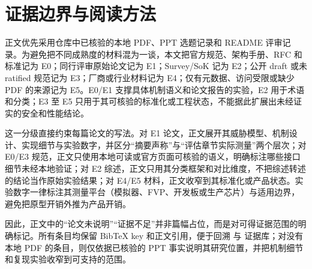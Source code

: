 \documentclass[11pt]{ctexart}
\begin{document}
\section{证据边界与阅读方法}

正文优先采用仓库中已核验的本地 PDF、PPT 选题记录和 README 评审记录。为避免把不同成熟度的材料混为一谈，本文把官方规范、架构手册、RFC 和标准记为 E0；同行评审原始论文记为 E1；Survey/SoK 记为 E2；公开 draft 或未 ratified 规范记为 E3；厂商或行业材料记为 E4；仅有元数据、访问受限或缺少 PDF 的来源记为 E5。E0/E1 支撑具体机制语义和论文报告的实验，E2 用于术语和分类；E3 至 E5 只用于其可核验的标准化或工程状态，不能据此扩展出未经证实的安全和性能结论。

这一分级直接约束每篇论文的写法。对 E1 论文，正文展开其威胁模型、机制设计、实现细节与实验数字，并区分“摘要声称”与“评估章节实际测量”两个层次；对 E0/E3 规范，正文只使用本地可读或官方页面可核验的语义，明确标注哪些接口细节未经本地验证；对 E2 综述，正文只用其分类框架和对比维度，不把综述转述的结论当作原始实验结果；对 E4/E5 材料，正文收窄到其标准化或产品状态。实验数字一律标注其测量平台（模拟器、FVP、开发板或生产芯片）与适用边界，避免把原型开销外推为产品开销。

因此，正文中的“论文未说明”“证据不足”并非篇幅占位，而是对可得证据范围的明确标记。所有条目均保留 BibTeX key 和正文引用，便于回溯  与  证据库；对没有本地 PDF 的条目，则仅依据已核验的 PPT 事实说明其研究位置，并把机制细节和复现实验收窄到可支持的范围。
\end{document}
